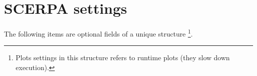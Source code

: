 \documentclass[a4paper,10pt]{article}
\begin{document}
\section{SCERPA settings} \label{sec:settings}
\noindent The following items are optional fields of a unique structure \footnote{Plots settings in this structure refers to runtime plots (they slow down execution).}. 

\begin{description}



\end{description}
\end{document}
